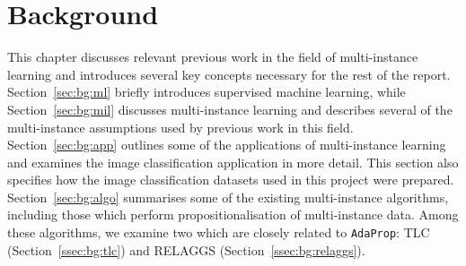 \documentclass[a4paper,12pt]{report} %
\newcommand{\AdaProp}{\texttt{AdaProp}\xspace}
\begin{document}
	


\chapter{Background}
\label{chap:bg}

This chapter discusses relevant previous work
	in the field of multi-instance learning and 
	introduces several key concepts necessary for
	the rest of the report.
Section~\ref{sec:bg:ml} briefly introduces supervised machine learning, 
	while Section~\ref{sec:bg:mil} discusses multi-instance learning 
	and describes several of the multi-instance assumptions used by previous work in this field.
Section~\ref{sec:bg:app} outlines some of the applications of multi-instance learning and
	examines the image classification application in more detail.
This section also specifies how the image classification datasets 
	used in this project were prepared.
Section~\ref{sec:bg:algo} summarises some of the existing multi-instance algorithms,
	including those which perform propositionalisation of multi-instance data.
Among these algorithms, we examine two which are closely related
	to \AdaProp: TLC (Section~\ref{ssec:bg:tlc}) and RELAGGS (Section~\ref{ssec:bg:relaggs}).

\begin{comment}
Multi-instance learning is a generalisation of 
    standard supervised machine learning,
    where class labels are assigned to bags (i.e.\ multi sets) of instances.
In the literature, there are several algorithms
    designed specifically for multi-instance learning.
There are also algorithms which were created by 
    adapting well known standard machine learning algorithms to handle
    multi-instance data.
In this project, we consider a different approach known as propositionalisation,
    where each bag of a multi-instance dataset is converted into a fixed-size 
    vector.
Propositionalisation allows any existing standard machine learning algorithm
    to be applied to a multi-instance dataset, 
    but requires an appropriate method for converting each bag into a feature vector.
We propose an algorithm, \AdaProp, which performs this propositionalisation.
Among the existing propositionalisation approaches, 
	\AdaProp is related to the TLC and RELAGGS algorithms, 
	both of which are discussed in this chapter. 
  
Multi-instance learning has been applied to several domains,
    including classification of molecules, image classification and text classification.
In this project, we focus on the application of image classification
	and summarize some of the existing work on the 
	conversion of image datasets into a multi-instance representation.
We also consider some multi-instance datasets in chemical domains.
\end{comment}
\end{document}
